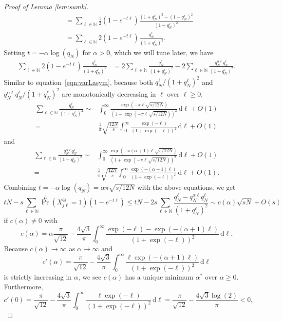 \documentclass{article}
\theoremstyle{definition}
\renewcommand{\leq}{\leqslant}
\renewcommand{\geq}{\geqslant}
\newcommand{\natu}{\mathbb{N}}
\newcommand{\rd}{\,\mathrm{d}}
\begin{document}
\begin{proof}[Proof of Lemma \ref{lem:sumk}]
\begin{align*}
        &=\sum_{\ell\in\natu}\frac{1}{2}(1-e^{-t\ell })\frac{(1+q_N^\ell)^2-(1-q_N^\ell)^2}{(1+q_N^\ell)^2}\\
        &=\sum_{\ell\in\natu}2(1-e^{-t\ell })\frac{q_N^\ell}{(1+q_N^\ell)^2}.
    \end{align*}
    Setting $t=-\alpha\log(q_N)$ for $\alpha> 0$, which we will tune later, we have
    \begin{align*}
    \sum_{\ell\in\natu}2(1-e^{-t\ell })\frac{q_N^\ell}{(1+q_N^\ell)^2}
        &=2\sum_{\ell\in\natu}\frac{q_N^\ell}{(1+q_N^\ell)^2}-2\sum_{\ell\in\natu}\frac{q_N^{\alpha\ell}q_N^\ell}{(1+q_N^\ell)^2}.
    \end{align*}
    Similar to equation~\eqref{eqn:varLasym}, because both $q_N^\ell/(1+q_N^\ell)^2$ and $q_N^{\alpha\ell}q_N^\ell/(1+q_N^\ell)^2$ are monotonically decreasing in $\ell$ over $\ell\geq 0$,
    \begin{align*}
       \sum_{\ell\in\natu}\frac{q_N^\ell}{(1+q_N^\ell)^2}\sim &\int_0^\infty \frac{ \exp(-\pi\ell\sqrt{s/12N})}{(1+\exp(-\pi\ell\sqrt{s/12N}))^2}\rd\ell+O(1)\\
       =&\frac{1}{\pi}\sqrt{\frac{12 N}{s}}\int_0^\infty \frac{ \exp(-\ell)}{(1+\exp(-\ell))^2}\rd\ell+O(1)
    \end{align*}
    and
    \begin{align*}
        \sum_{\ell\in\natu}\frac{q_N^{\alpha\ell}q_N^\ell}{(1+q_N^\ell)^2}\sim &\int_0^\infty \frac{ \exp(-\pi(\alpha+1)\ell\sqrt{s/12N})}{(1+\exp(-\pi\ell\sqrt{s/12N}))^2}\rd\ell+O(1)\\
        =&\frac{1}{\pi}\sqrt{\frac{12 N}{s}}\int_0^\infty \frac{ \exp(-(\alpha+1)\ell)}{(1+\exp(-\ell))^2}\rd\ell+O(1). 
    \end{align*}
    Combining $t=-\alpha\log(q_N)=\alpha \pi\sqrt{s/12N}$ with the above equations, we get
    $$tN-s\sum_{\ell\in\natu}{\textstyle\Pr}^L(X^\oplus_{j\ell}=1)(1-e^{-t\ell })\leq tN-2s\sum_{\ell\in\natu}\frac{q_N^\ell-q_N^{\alpha\ell}q_N^\ell}{(1+q_N^\ell)^2}\sim c(\alpha)\sqrt{sN}+O(s)$$
    if $c(\alpha)\neq 0$ with 
    $$c(\alpha)=\alpha\frac{\pi}{\sqrt{12}}-\frac{4\sqrt{3 }}{\pi}\int_0^\infty \frac{\exp(-\ell)- \exp(-(\alpha+1)\ell)}{(1+\exp(-\ell))^2}\rd\ell.$$
    Because $c(\alpha)\to\infty$ as $\alpha\to \infty$ and
    $$c'(\alpha)=\frac{\pi}{\sqrt{12}}-\frac{4\sqrt{3}}{\pi}\int_0^\infty \frac{ \ell\exp(-(\alpha+1)\ell)}{(1+\exp(-\ell))^2}\rd\ell$$
    is strictly increasing in $\alpha$, we see $c(\alpha)$ has a unique minimum $\alpha^*$ over $\alpha\geq 0$. Furthermore,
     $$c'(0)=\frac{\pi}{\sqrt{12}}-\frac{4\sqrt{3}}{\pi}\int_0^\infty \frac{ \ell\exp(-\ell)}{(1+\exp(-\ell))^2}\rd\ell=\frac{\pi}{\sqrt{12}}-\frac{4\sqrt{3}\log(2)}{\pi}<0,$$

\end{proof}
\end{document}
